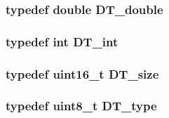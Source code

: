 \subsubsection[{DT\_\-double}]{\setlength{\rightskip}{0pt plus 5cm}typedef double {\bf DT\_\-double}}\label{datatypes_8h_a2e543411955afdb31c0d9feefd1cefed}
\subsubsection[{DT\_\-int}]{\setlength{\rightskip}{0pt plus 5cm}typedef int {\bf DT\_\-int}}\label{datatypes_8h_a6ae9a32229cf3ddd0996e852782f7ca4}
\subsubsection[{DT\_\-size}]{\setlength{\rightskip}{0pt plus 5cm}typedef uint16\_\-t {\bf DT\_\-size}}\label{datatypes_8h_a690ffbb6ad43eab1176f91d2097fc967}
\subsubsection[{DT\_\-type}]{\setlength{\rightskip}{0pt plus 5cm}typedef uint8\_\-t {\bf DT\_\-type}}\label{datatypes_8h_a3f264c95c6daf779bd706d321c7f0791}
